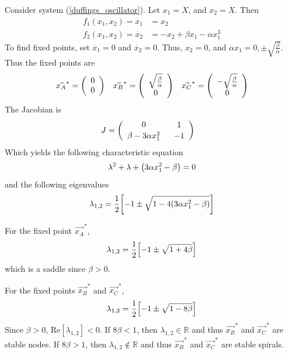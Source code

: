 \documentclass[12pt]{article}
\begin{document}
Consider system (\ref{duffings_oscillator}).  Let $x_1 = X$, and $x_2 = \dot{X}$.  Then
\begin{align*}
	f_1(x_1, x_2) = \dot{x_1} &= x_2 \\[.05cm]
	f_2(x_1, x_2) = \dot{x_2} &= -x_2 + \beta x_1 - \alpha x_1^3
\end{align*}
To find fixed points, set $\dot{x_1} = 0$ and $\dot{x_2} = 0$.  Thus, $x_2 = 0$, and $\alpha x_1 = 0, \pm \sqrt{\frac{\beta}{\alpha}}$.  Thus the fixed points are
\begin{align*}
	\vec{x_A}^* = \qty(\begin{array}{cc}0 \\ 0\end{array})\ \ \ \vec{x_B}^* = \qty(\begin{array}{cc}\sqrt{\frac{\beta}{\alpha}} \\ 0\end{array})\ \ \ \vec{x_C}^* = \qty(\begin{array}{cc}-\sqrt{\frac{\beta}{\alpha}} \\ 0\end{array})
\end{align*}
The Jacobian is
\begin{align*}
	J &= \qty(\begin{array}{cc}
		0\ &\ 1 \\[.05cm]
		\beta - 3\alpha x_1^2\ &\ -1
	\end{array})
\end{align*}
Which yields the following characteristic equation
\begin{align*}
	\lambda^2 + \lambda + \qty(3\alpha x_1^2 - \beta) = 0
\end{align*}
and the following eigenvalues
\begin{align*}
	\lambda_{1,2} = \frac{1}{2}\qty[-1 \pm \sqrt{1 - 4\qty(3\alpha x_1^2 - \beta)}]
\end{align*}

For the fixed point $\vec{x_A}^*$,
\begin{align*}
	\lambda_{1,2} = \frac{1}{2}\qty[-1 \pm \sqrt{1 + 4\beta}]
\end{align*}
which is a saddle since $\beta > 0$.

For the fixed points $\vec{x_B}^*$ and $\vec{x_C}^*$,
\begin{align*}
	\lambda_{1,2} = \frac{1}{2}\qty[-1 \pm \sqrt{1 - 8\beta}]
\end{align*}
Since $\beta > 0$, $\text{Re}[\lambda_{1,2}] < 0$.  If $8\beta < 1$, then $\lambda_{1,2} \in \mathbb{R}$ and thus $\vec{x_B}^*$ and $\vec{x_C}^*$ are stable nodes.  If $8\beta > 1$, then $\lambda_{1,2} \not\in \mathbb{R}$ and thus $\vec{x_B}^*$ and $\vec{x_C}^*$ are stable spirals.
\end{document}
